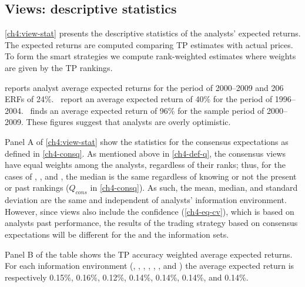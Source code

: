 \documentclass[a4paper,12pt,openright,notitlepage]{report}\usepackage[]{graphicx}\usepackage[]{color}
\begin{document}
\subsection{Views: descriptive statistics}


\ref{ch4:view-stat} presents the descriptive statistics of the analysts' expected returns. The expected returns  are computed comparing TP estimates with actual prices. To form the smart strategies we compute rank-weighted estimates where weights are given  by the TP rankings.

\cite{bradshaw2002} reports analyst average expected returns for the period of 2000--2009 and 206 ERFs of 24\%.~\cite{da2011} report an average expected return of 40\% for the period of 1996--2004.~\cite{zhou2013} finds an average expected return of 96\% for the sample period of 2000--2009. These figures suggest that analysts are overly optimistic.

Panel A of \ref{ch4:view-stat} show the statistics for the consensus expectations as defined in \ref{ch4-consq}. As mentioned above in \ref{ch4-def-q}, the consensus views have equal weights among the analysts, regardless of their ranks; thus, for the cases of \tr{}, \naive{}, and , the median is the same regardless of knowing or not the present or past rankings ($Q_{cons}$ in  \ref{ch4-consq}). As such, the mean, median, and standard deviation are the same and independent of analysts' information environment. However, since views also include the confidence (\ref{ch4-eq-cv}), which is based on analysts past performance, the results of the trading strategy based on consensus expectations will be different for the \naive{} and the  information sets.



Panel B of the table shows the TP accuracy weighted average expected returns. For each information environment (\tr{}, \naive{}, , \last{}, \diff{}, \random{}, and \rollsd{} ) the average expected return  is respectively 0.15\%, 0.16\%,  0.12\%, 0.14\%, 0.14\%, 0.14\%, and 0.14\%.
\end{document}
